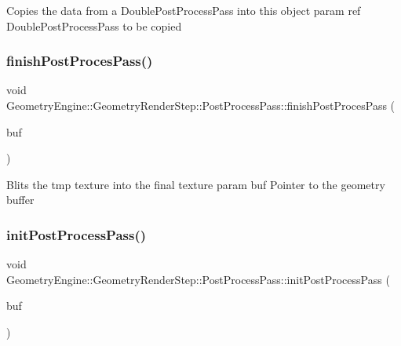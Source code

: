 Copies the data from a Double\+Post\+Process\+Pass into this object param ref Double\+Post\+Process\+Pass to be copied \mbox{\label{class_geometry_engine_1_1_geometry_render_step_1_1_post_process_pass_abfc2e269aad1157916f6c3c72b570ae9}} 
\subsubsection{\texorpdfstring{finishPostProcesPass()}{finishPostProcesPass()}}
{\footnotesize\ttfamily void Geometry\+Engine\+::\+Geometry\+Render\+Step\+::\+Post\+Process\+Pass\+::finish\+Post\+Proces\+Pass (\begin{DoxyParamCaption}\item[{\mbox{\hyperlink{class_geometry_engine_1_1_geometry_buffer_1_1_g_buffer}{Geometry\+Buffer\+::\+G\+Buffer}} $\ast$}]{buf }\end{DoxyParamCaption})\hspace{0.3cm}{\ttfamily [protected]}}

Blits the tmp texture into the final texture param buf Pointer to the geometry buffer \mbox{\label{class_geometry_engine_1_1_geometry_render_step_1_1_post_process_pass_ae0bfafe4123decb5eb65e1decc3c07ba}} 
\subsubsection{\texorpdfstring{initPostProcessPass()}{initPostProcessPass()}}
{\footnotesize\ttfamily void Geometry\+Engine\+::\+Geometry\+Render\+Step\+::\+Post\+Process\+Pass\+::init\+Post\+Process\+Pass (\begin{DoxyParamCaption}\item[{\mbox{\hyperlink{class_geometry_engine_1_1_geometry_buffer_1_1_g_buffer}{Geometry\+Buffer\+::\+G\+Buffer}} $\ast$}]{buf }\end{DoxyParamCaption})\hspace{0.3cm}{\ttfamily [protected]}}

